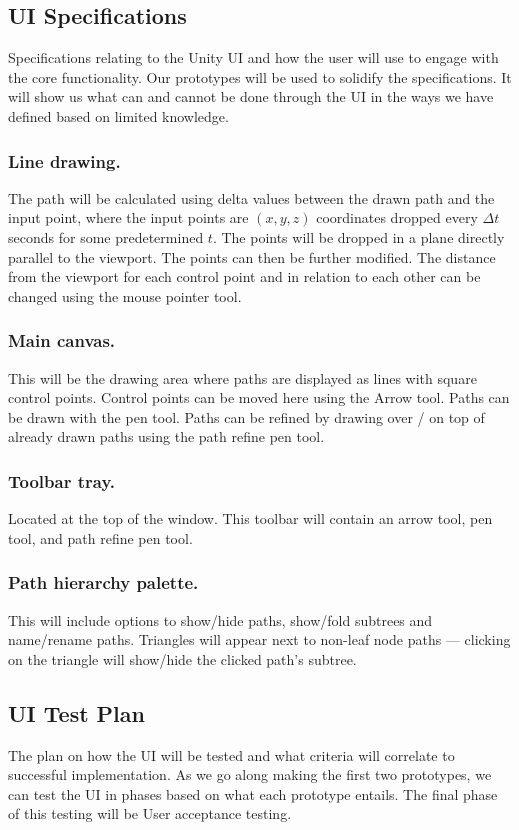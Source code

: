 \subsection{UI Specifications}
Specifications relating to the Unity UI and how the user will use to engage with the core functionality. Our prototypes will be used to solidify the specifications. It will show us what can and cannot be done through the UI in the ways we have defined based on limited knowledge.


\subsubsection{Line drawing.} The path will be calculated using delta values between the drawn path and the input point, where the input points are $(x,y,z)$ coordinates dropped every $\Delta t$ seconds for some predetermined $t$. The points will be dropped in a plane directly parallel to the viewport. The points can then be further modified. The distance from the viewport for each control point and in relation to each other can be changed using the mouse pointer tool.

\subsubsection{Main canvas.} This will be the drawing area where paths are displayed as lines with square control points. Control points can be moved here using the Arrow tool. Paths can be drawn with the pen tool. Paths can be refined by drawing over / on top of already drawn paths using the path refine pen tool.

\subsubsection{Toolbar tray.} Located at the top of the window. This toolbar will contain an arrow tool, pen tool, and path refine pen tool.

\subsubsection{Path hierarchy palette.} This will include options to show/hide paths, show/fold subtrees and name/rename paths. Triangles will appear next to non-leaf node paths --- clicking on the triangle will show/hide the clicked path’s subtree.

\subsection{UI Test Plan}
The plan on how the UI will be tested and what criteria will correlate to successful implementation. As we go along making the first two prototypes, we can test the UI in phases based on what each prototype entails. The final phase of this testing will be User acceptance testing.


